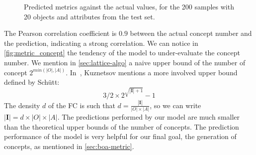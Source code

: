\begin{figure}
\centering
{}
\caption{Predicted metrics against the actual values, for the 200 samples with 20 objects and attributes from the test set.}\label{fig:metric}
\end{figure}


The Pearson correlation coefficient is $0.9$ between the actual concept number and the prediction, indicating a strong correlation.
We can notice in \cref{fig:metric_concept} the tendency of the model to under-evaluate the concept number.
We mention in \cref{sec:lattice-algo} a naive upper bound of the number of concept $2^{min(|O|,|A|)}$. In~\cite[p. 2]{lattice-size:2001:kuznetsov}, Kuznetsov mentions a more involved upper bound defined by Schütt:
$$3/2 \times 2^{\sqrt{|\mathbf{I}| + 1}} - 1$$
The density $d$ of the FC is such that $d = \frac{|\mathbf{I}|}{|O|\times|A|}$, so we can write $|\mathbf{I}| = d \times |O|\times|A|$.
The predictions performed by our model are much smaller than the theoretical upper bounds of the number of concepts.
The prediction performance of the model is very helpful for our final goal, the generation of concepts, as mentioned in \cref{sec:boa-metric}.

